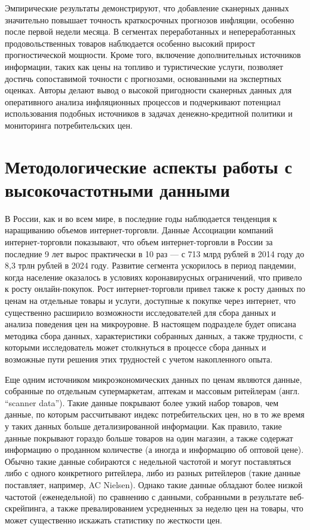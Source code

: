 Эмпирические результаты демонстрируют, что добавление сканерных данных значительно повышает точность краткосрочных прогнозов инфляции, особенно после первой недели месяца. В сегментах переработанных и непереработанных продовольственных товаров наблюдается особенно высокий прирост прогностической мощности. Кроме того, включение дополнительных источников информации, таких как цены на топливо и туристические услуги, позволяет достичь сопоставимой точности с прогнозами, основанными на экспертных оценках. Авторы делают вывод о высокой пригодности сканерных данных для оперативного анализа инфляционных процессов и подчеркивают потенциал использования подобных источников в задачах денежно-кредитной политики и мониторинга потребительских цен.



\section{Методологические аспекты работы с высокочастотными данными}

В России, как и во всем мире, в последние годы наблюдается тенденция к наращиванию объемов интернет-торговли. Данные Ассоциации компаний интернет-торговли показывают, что объем интернет-торговли в России за последние 9 лет вырос практически в 10 раз  --- с 713 млрд рублей в 2014 году до 8,3 трлн рублей в 2024 году. Развитие сегмента ускорилось в период пандемии, когда население оказалось в условиях коронавирусных ограничений, что привело к росту онлайн-покупок. Рост интернет-торговли привел также к росту данных по ценам на отдельные товары и услуги, доступные к покупке через интернет, что существенно расширило возможности исследователей для сбора данных и анализа поведения цен на микроуровне. В настоящем подразделе будет описана методика сбора данных, характеристики собранных данных, а также трудности, с которыми исследователь может столкнуться в процессе сбора данных и возможные пути решения этих трудностей с учетом накопленного опыта.

Еще одним источником микроэкономических данных по ценам являются данные, собранные по отдельным супермаркетам, аптекам и массовым ритейлерам (англ. ``scanner data''). Такие данные покрывают более узкий набор товаров, чем данные, по которым рассчитывают индекс потребительских цен, но в то же время у таких данных больше детализированной информации. Как правило, такие данные покрывают гораздо больше товаров на один магазин, а также содержат информацию о проданном количестве (а иногда и информацию об оптовой цене). Обычно такие данные собираются с недельной частотой и могут поставляться либо с одного конкретного ритейлера, либо из разных ритейлеров (такие данные поставляет, например, AC Nielsen). Однако такие данные обладают более низкой частотой (еженедельной) по сравнению с данными, собранными в результате веб-скрейпинга, а также превалированием усредненных за неделю цен на товары, что может существенно искажать статистику по жесткости цен.

